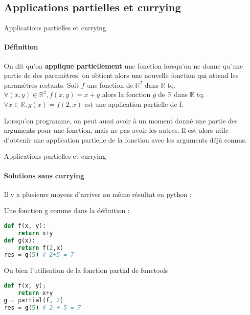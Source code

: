 \documentclass[aspectratio=169]{beamer}
\begin{document}
\subsection{Applications partielles et currying}

\begin{frame}[fragile]{Applications partielles et currying}

    \framesubtitle{Définition}

    On dit qu'on \textbf{applique partiellement} une fonction lorsqu'on ne donne qu'une partie de des paramètres, on obtient alors une nouvelle fonction qui attend les paramètres restants.
    Soit $f$ une fonction de $\mathbb{R}^2$ dans $\mathbb{R}$ tq. $\forall (x, y) \in \mathbb{R}^2, f(x, y) = x + y$ alors la fonction $g$ de $\mathbb{R}$ dans $\mathbb{R}$ tq. $\forall x \in \mathbb{R}, g(x) = f(2, x)$ est une application partielle de f.
    
    Lorsqu'on programme, on peut aussi avoir à un moment donné une partie des arguments pour une fonction, mais ne pas avoir les autres. Il est alors utile d'obtenir une application partielle de la fonction avec les arguments déjà connus.
    
\end{frame}

\begin{frame}[fragile]{Applications partielles et currying}

    \framesubtitle{Solutions sans currying}
    
    Il y a plusieurs moyens d'arriver au même résultat en python :
    
    Une fonction g comme dans la définition :
    
    \begin{lstlisting}[language=Python]
def f(x, y):
    return x+y
def g(x):
    return f(2,x)
res = g(5) # 2+5 = 7
    \end{lstlisting}

    Ou bien l'utilisation de la fonction partial de functools

    \begin{lstlisting}[language=Python]
def f(x, y);
    return x+y
g = partial(f, 2)
res = g(5) # 2 + 5 = 7
    \end{lstlisting}
    
\end{frame}
\end{document}
